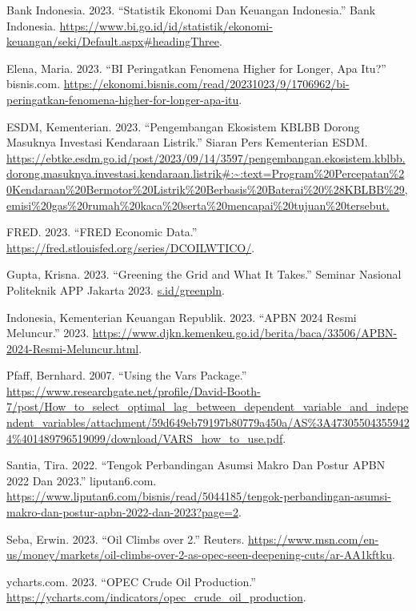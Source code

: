 \documentclass[
  a4paper,
  DIV=11,
  numbers=noendperiod]{scrreprt}
\newlength{\cslhangindent}
\newlength{\cslentryspacingunit} %
\newenvironment{CSLReferences}[2] %
 {%
  \setlength{\parindent}{0pt}
  \ifodd #1
  \let\oldpar\par
  \def\par{\hangindent=\cslhangindent\oldpar}
  \fi
  \setlength{\parskip}{#2\cslentryspacingunit}
 }%
 {}
\begin{document}
\hypertarget{refs}{}
\begin{CSLReferences}{1}{0}
\leavevmode{}%
Bank Indonesia. 2023. {``Statistik Ekonomi Dan Keuangan Indonesia.''}
Bank Indonesia.
\url{https://www.bi.go.id/id/statistik/ekonomi-keuangan/seki/Default.aspx\#headingThree}.

\leavevmode{}%
Elena, Maria. 2023. {``BI Peringatkan Fenomena Higher for Longer, Apa
Itu?''} bisnis.com.
\url{https://ekonomi.bisnis.com/read/20231023/9/1706962/bi-peringatkan-fenomena-higher-for-longer-apa-itu}.

\leavevmode{}%
ESDM, Kementerian. 2023. {``Pengembangan Ekosistem KBLBB Dorong Masuknya
Investasi Kendaraan Listrik.''} Siaran Pers Kementerian ESDM.
\url{https://ebtke.esdm.go.id/post/2023/09/14/3597/pengembangan.ekosistem.kblbb.dorong.masuknya.investasi.kendaraan.listrik\#:~:text=Program\%20Percepatan\%20Kendaraan\%20Bermotor\%20Listrik\%20Berbasis\%20Baterai\%20\%28KBLBB\%29,emisi\%20gas\%20rumah\%20kaca\%20serta\%20mencapai\%20tujuan\%20tersebut.}

\leavevmode{}%
FRED. 2023. {``FRED Economic Data.''}
\url{https://fred.stlouisfed.org/series/DCOILWTICO/}.

\leavevmode{}%
Gupta, Krisna. 2023. {``Greening the Grid and What It Takes.''} Seminar
Nasional Politeknik APP Jakarta 2023.
\href{https://s.id/greenpln}{s.id/greenpln}.

\leavevmode{}%
Indonesia, Kementerian Keuangan Republik. 2023. {``APBN 2024 Resmi
Meluncur.''} 2023.
\url{https://www.djkn.kemenkeu.go.id/berita/baca/33506/APBN-2024-Resmi-Meluncur.html}.

\leavevmode{}%
Pfaff, Bernhard. 2007. {``Using the Vars Package.''}
\url{https://www.researchgate.net/profile/David-Booth-7/post/How_to_select_optimal_lag_between_dependent_variable_and_independent_variables/attachment/59d649eb79197b80779a450a/AS\%3A473055043559424\%401489796519099/download/VARS_how_to_use.pdf}.

\leavevmode{}%
Santia, Tira. 2022. {``Tengok Perbandingan Asumsi Makro Dan Postur APBN
2022 Dan 2023.''} liputan6.com.
\url{https://www.liputan6.com/bisnis/read/5044185/tengok-perbandingan-asumsi-makro-dan-postur-apbn-2022-dan-2023?page=2}.

\leavevmode{}%
Seba, Erwin. 2023. {``Oil Climbs over 2.''} Reuters.
\url{https://www.msn.com/en-us/money/markets/oil-climbs-over-2-as-opec-seen-deepening-cuts/ar-AA1kftku}.

\leavevmode{}%
ycharts.com. 2023. {``OPEC Crude Oil Production.''}
\url{https://ycharts.com/indicators/opec_crude_oil_production}.

\end{CSLReferences}
\end{document}
